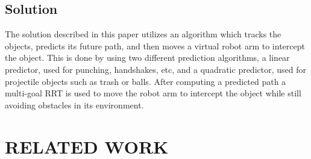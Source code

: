 \documentclass[letterpaper, 10 pt, conference]{ieeeconf}  %
\begin{document}
\subsection{Solution}

The solution described in this paper utilizes an algorithm which tracks the
objects, predicts its future path, and then moves a virtual robot arm to
intercept the object. This is done by using two different prediction
algorithms, a linear predictor, used for punching, handshakes, etc, and a
quadratic predictor, used for projectile objects such as trash or balls. After
computing a predicted path a multi-goal RRT is used to move the robot arm to
intercept the object while still avoiding obstacles in its environment.



\section{RELATED WORK}
\end{document}
